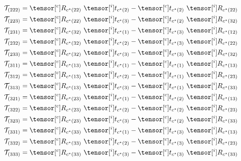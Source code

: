 \begin{equation}
\begin{gathered}
  \mathcal{T}_{(222)} = \tensor[^{c}]{R}{_{c^{*}(22)}} \ \tensor[^{i}]{t}{_{c^{*}(2)}} - \tensor[^{c}]{t}{_{c^{*}(2)}} \ \tensor[^{i}]{R}{_{c^{*}(22)}}\\
  \mathcal{T}_{(223)} = \tensor[^{c}]{R}{_{c^{*}(22)}} \ \tensor[^{i}]{t}{_{c^{*}(3)}} - \tensor[^{c}]{t}{_{c^{*}(2)}} \ \tensor[^{i}]{R}{_{c^{*}(32)}}\\
  \mathcal{T}_{(231)} = \tensor[^{c}]{R}{_{c^{*}(32)}} \ \tensor[^{i}]{t}{_{c^{*}(1)}} - \tensor[^{c}]{t}{_{c^{*}(3)}} \ \tensor[^{i}]{R}{_{c^{*}(12)}}\\
  \mathcal{T}_{(232)} = \tensor[^{c}]{R}{_{c^{*}(32)}} \ \tensor[^{i}]{t}{_{c^{*}(2)}} - \tensor[^{c}]{t}{_{c^{*}(3)}} \ \tensor[^{i}]{R}{_{c^{*}(22)}}\\
  \mathcal{T}_{(233)} = \tensor[^{c}]{R}{_{c^{*}(32)}} \ \tensor[^{i}]{t}{_{c^{*}(3)}} - \tensor[^{c}]{t}{_{c^{*}(3)}} \ \tensor[^{i}]{R}{_{c^{*}(32)}}\\
  \mathcal{T}_{(311)} = \tensor[^{c}]{R}{_{c^{*}(13)}} \ \tensor[^{i}]{t}{_{c^{*}(1)}} - \tensor[^{c}]{t}{_{c^{*}(1)}} \ \tensor[^{i}]{R}{_{c^{*}(13)}}\\
  \mathcal{T}_{(312)} = \tensor[^{c}]{R}{_{c^{*}(13)}} \ \tensor[^{i}]{t}{_{c^{*}(2)}} - \tensor[^{c}]{t}{_{c^{*}(1)}} \ \tensor[^{i}]{R}{_{c^{*}(23)}}\\
  \mathcal{T}_{(313)} = \tensor[^{c}]{R}{_{c^{*}(13)}} \ \tensor[^{i}]{t}{_{c^{*}(3)}} - \tensor[^{c}]{t}{_{c^{*}(1)}} \ \tensor[^{i}]{R}{_{c^{*}(33)}}\\
  \mathcal{T}_{(321)} = \tensor[^{c}]{R}{_{c^{*}(23)}} \ \tensor[^{i}]{t}{_{c^{*}(1)}} - \tensor[^{c}]{t}{_{c^{*}(2)}} \ \tensor[^{i}]{R}{_{c^{*}(13)}}\\
  \mathcal{T}_{(322)} = \tensor[^{c}]{R}{_{c^{*}(23)}} \ \tensor[^{i}]{t}{_{c^{*}(2)}} - \tensor[^{c}]{t}{_{c^{*}(2)}} \ \tensor[^{i}]{R}{_{c^{*}(23)}}\\
  \mathcal{T}_{(323)} = \tensor[^{c}]{R}{_{c^{*}(23)}} \ \tensor[^{i}]{t}{_{c^{*}(3)}} - \tensor[^{c}]{t}{_{c^{*}(2)}} \ \tensor[^{i}]{R}{_{c^{*}(33)}}\\
  \mathcal{T}_{(331)} = \tensor[^{c}]{R}{_{c^{*}(33)}} \ \tensor[^{i}]{t}{_{c^{*}(1)}} - \tensor[^{c}]{t}{_{c^{*}(3)}} \ \tensor[^{i}]{R}{_{c^{*}(13)}}\\
  \mathcal{T}_{(332)} = \tensor[^{c}]{R}{_{c^{*}(33)}} \ \tensor[^{i}]{t}{_{c^{*}(2)}} - \tensor[^{c}]{t}{_{c^{*}(3)}} \ \tensor[^{i}]{R}{_{c^{*}(23)}}\\
  \mathcal{T}_{(333)} = \tensor[^{c}]{R}{_{c^{*}(33)}} \ \tensor[^{i}]{t}{_{c^{*}(3)}} - \tensor[^{c}]{t}{_{c^{*}(3)}} \ \tensor[^{i}]{R}{_{c^{*}(33)}}
\end{gathered}\label{eq:tensorcoeffsexpanded}
\end{equation}

